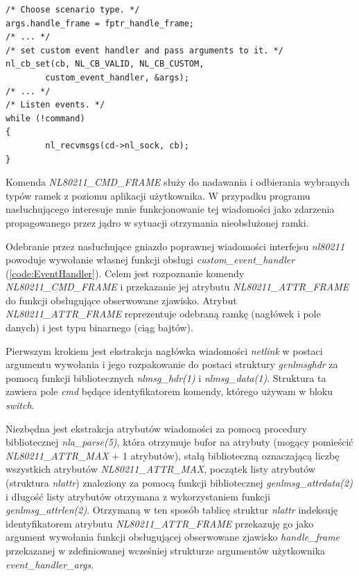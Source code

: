 \begin{lstlisting}[frame=tb]
/* Choose scenario type. */
args.handle_frame = fptr_handle_frame;
/* ... */
/* set custom event handler and pass arguments to it. */
nl_cb_set(cb, NL_CB_VALID, NL_CB_CUSTOM,
        custom_event_handler, &args);
/* ... */
/* Listen events. */
while (!command)
{
        nl_recvmsgs(cd->nl_sock, cb);
}
\end{lstlisting}

Komenda \emph{NL80211\_CMD\_FRAME} służy do nadawania i odbierania wybranych typów ramek z poziomu aplikacji użytkownika. W przypadku programu nasłuchującego interesuje mnie funkcjonowanie tej wiadomości jako zdarzenia propagowanego przez jądro w sytuacji otrzymania nieobsłużonej ramki. 

Odebranie przez nasłuchujące gniazdo poprawnej wiadomości interfejsu \emph{nl80211} powoduje wywołanie własnej funkcji obsługi \emph{custom\_event\_handler} (\ref{code:EventHandler}). Celem jest rozpoznanie komendy \emph{NL80211\_CMD\_FRAME} i przekazanie jej atrybutu \emph{NL80211\_ATTR\_FRAME} do funkcji obsługujące obserwowane zjawisko. Atrybut \emph{NL80211\_ATTR\_FRAME} reprezentuje odebraną ramkę (nagłówek i pole danych) i jest typu binarnego (ciąg bajtów). 

Pierwszym krokiem jest ekstrakcja nagłówka wiadomości \emph{netlink} w postaci argumentu wywołania i jego rozpakowanie  do postaci struktury \emph{genlmsghdr} za pomocą funkcji bibliotecznych \emph{nlmsg\_hdr(1)} i \emph{nlmsg\_data(1)}. Struktura ta zawiera pole \emph{cmd} będące identyfikatorem komendy, którego używam w bloku \emph{switch}.

Niezbędna jest ekstrakcja atrybutów wiadomości za pomocą procedury bibliotecznej \emph{nla\_parse(5)}, która otrzymuje bufor na atrybuty (mogący pomieścić \emph{NL80211\_ATTR\_MAX} + 1 atrybutów), stałą biblioteczną oznaczającą liczbę wszystkich atrybutów \emph{NL80211\_ATTR\_MAX}, początek listy atrybutów (struktura \emph{nlattr}) znaleziony za pomocą funkcji bibliotecznej \emph{genlmsg\_attrdata(2)} i długość listy atrybutów otrzymana z wykorzystaniem funkcji \emph{genlmsg\_attrlen(2)}. Otrzymaną w ten sposób tablicę struktur \emph{nlattr} indeksuję identyfikatorem atrybutu \emph{NL80211\_ATTR\_FRAME} przekazuję go jako argument wywołania funkcji obsługującej obserwowane zjawisko \emph{handle\_frame} przekazanej w zdefiniowanej wcześniej strukturze argumentów użytkownika \emph{event\_handler\_args}. 


